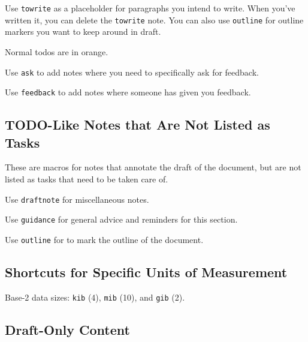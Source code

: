 Use \lstinline{towrite} as a placeholder for paragraphs you intend to write.
When you've written it, you can delete the \lstinline{towrite} note.
You can also use \lstinline{outline} for outline markers you want to keep around in draft.



Normal todos are in orange.

Use \lstinline{ask} to add notes where you need to specifically ask for feedback.

Use \lstinline{feedback} to add notes where someone has given you feedback.



\subsection{TODO-Like Notes that Are Not Listed as Tasks}

These are macros for notes that annotate the draft of the document,
but are not listed as tasks that need to be taken care of.

Use \lstinline{draftnote} for miscellaneous notes.

Use \lstinline{guidance} for general advice and reminders for this section.

Use \lstinline{outline} for to mark the outline of the document.



\subsection{Shortcuts for Specific Units of Measurement}

Base-2 data sizes:
\lstinline{kib} (\SI{4}{\kib}),
\lstinline{mib} (\SI{10}{\mib}),
and
\lstinline{gib} (\SI{2}{\gib}).



\subsection{Draft-Only Content}

